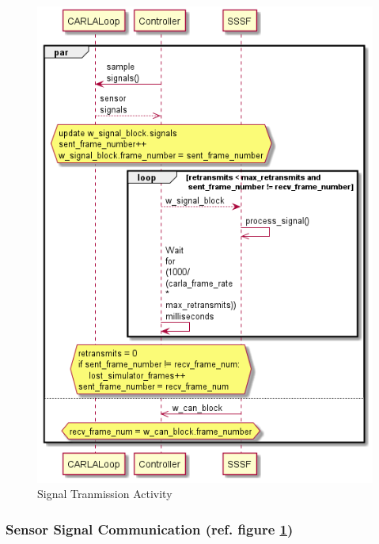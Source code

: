 \documentclass[letterpaper,twocolumn,12pt]{article}
\begin{document}
\begin{figure}[]
    \centering
    \includegraphics[scale=0.9]{out/images/signal_control/signal_control.png}
    \caption{Signal Tranmission Activity}
    \label{fig:sig_x}
\end{figure}
\subsubsection{Sensor Signal Communication (ref. figure \ref{fig:sig_x})} \label{sec:sig_x}
\end{document}
